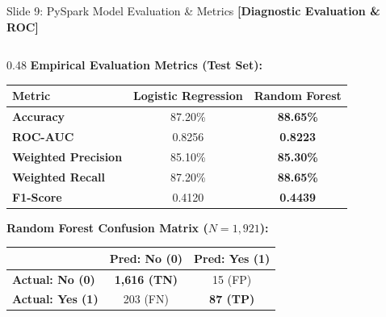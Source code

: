 \documentclass[aspectratio=169]{beamer}
\begin{document}
\begin{frame}{Slide 9: PySpark Model Evaluation \& Metrics \hfill \footnotesize\color{AmritaMaroon}\textbf{[Diagnostic Evaluation \& ROC]}}
    \begin{columns}[T]
        \begin{column}{0.48\textwidth}
            \textbf{\textcolor{NavyBlue}{Empirical Evaluation Metrics (Test Set):}}
            \vspace{0.02cm}
            {\fontsize{5.5}{6.8}\selectfont
            \begin{table}
                \centering
                \renewcommand{\arraystretch}{1.1}
                \begin{tabular}{lcc}
                    \toprule
                    \textbf{Metric} & \textbf{Logistic Regression} & \textbf{Random Forest} \\
                    \midrule
                    \textbf{Accuracy}          & 87.20\% & \textbf{88.65\%} \\
                    \textbf{ROC-AUC}           & 0.8256  & \textbf{0.8223} \\
                    \textbf{Weighted Precision}& 85.10\% & \textbf{85.30\%} \\
                    \textbf{Weighted Recall}   & 87.20\% & \textbf{88.65\%} \\
                    \textbf{F1-Score}          & 0.4120  & \textbf{0.4439} \\
                    \bottomrule
                \end{tabular}
            \end{table}
            }
            \vspace{0.02cm}
            \textbf{\textcolor{NavyBlue}{Random Forest Confusion Matrix ($N=1,921$):}}
            {\fontsize{5.5}{6.8}\selectfont
            \begin{table}
                \centering
                \begin{tabular}{lcc}
                    \toprule
                    & \textbf{Pred: No (0)} & \textbf{Pred: Yes (1)} \\
                    \midrule
                    \textbf{Actual: No (0)}  & \textbf{1,616 (TN)} & 15 (FP) \\
                    \textbf{Actual: Yes (1)} & 203 (FN)            & \textbf{87 (TP)} \\

\end{tabular}
\end{table}}
\end{column}
\end{columns}
\end{frame}
\end{document}
